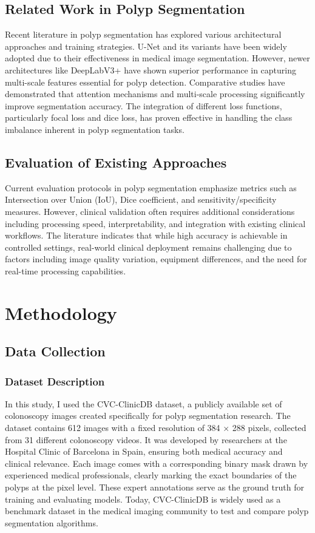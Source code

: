 \documentclass[a4paper,12pt]{report}
\begin{document}
\section{Related Work in Polyp Segmentation}
Recent literature in polyp segmentation has explored various architectural approaches and training strategies. U-Net and its variants have been widely adopted due to their effectiveness in medical image segmentation. However, newer architectures like DeepLabV3+ have shown superior performance in capturing multi-scale features essential for polyp detection.
Comparative studies have demonstrated that attention mechanisms and multi-scale processing significantly improve segmentation accuracy. The integration of different loss functions, particularly focal loss and dice loss, has proven effective in handling the class imbalance inherent in polyp segmentation tasks.


\section{Evaluation of Existing Approaches}
Current evaluation protocols in polyp segmentation emphasize metrics such as Intersection over Union (IoU), Dice coefficient, and sensitivity/specificity measures. However, clinical validation often requires additional considerations including processing speed, interpretability, and integration with existing clinical workflows.
The literature indicates that while high accuracy is achievable in controlled settings, real-world clinical deployment remains challenging due to factors including image quality variation, equipment differences, and the need for real-time processing capabilities.


\chapter{Methodology}
\section{Data Collection}
\subsection{Dataset Description}
In this study, I used the CVC-ClinicDB dataset, a publicly available set of colonoscopy images created specifically for polyp segmentation research. The dataset contains 612 images with a fixed resolution of 384 × 288 pixels, collected from 31 different colonoscopy videos. It was developed by researchers at the Hospital Clinic of Barcelona in Spain, ensuring both medical accuracy and clinical relevance.
Each image comes with a corresponding binary mask drawn by experienced medical professionals, clearly marking the exact boundaries of the polyps at the pixel level. These expert annotations serve as the ground truth for training and evaluating models. Today, CVC-ClinicDB is widely used as a benchmark dataset in the medical imaging community to test and compare polyp segmentation algorithms.
\end{document}
